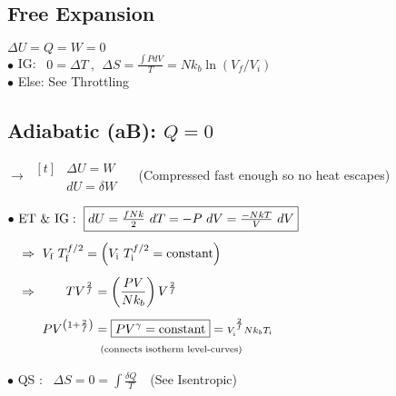 \documentclass[12pt]{article}
\begin{document}
\begin{minipage}[t]{.52\textwidth}
    \subsection{Free Expansion}
    \(\boxed{ \Delta U = Q = W = 0 }\)\\[5pt]
    \(\bullet\) IG: \ \(\boxed{ 0 = \Delta T } \ , \ \ 
        \boxed{ \Delta S = \tfrac{{\scriptstyle \int} P dV}{T} = N k_b \ln (V_f / V_i) }\)\\[5pt]
    \(\bullet\) Else: See Throttling

    \subsection{Adiabatic (aB): \(\boxed{ Q=0 }\)}
    
    \(\rightarrow\ \begin{aligned}[t]
            &\Delta U = W\\
            &\boxed{ dU = \delta W }
        \end{aligned}\) \ \ {\scriptsize(Compressed fast enough so no heat escapes)}

    \vspace{10pt}
    \(\bullet\ \begin{aligned}[t]
            &\text{ET \& IG}: \ \boxed{ dU = \tfrac{f N k}{2}\ dT = - P\ dV = \tfrac{- N k T}{V}\ dV }
                \\[5pt]
            &\Rightarrow\ V_\text{f}\ T_\text{f}^{f/2} 
                = \left( V_\text{i}\ T_\text{i}^{f/2} = \text{constant} \right)\\[5pt]
            &\Rightarrow\ \begin{aligned}[t]
                    T V^{\frac{2}{f}} &= \left( \frac{PV}{Nk_b} \right) V^{\frac{2}{f}}\\[5pt]
                    PV^{\left( 1+\frac{2}{f} \right)} &= \boxed{ PV^{\gamma} = \text{constant} }
                        = {\scriptstyle V_\text{i}^{\frac{2}{f}} N k_b T_\text{i}}\\
                    &\hspace{5pt} \text{\scriptsize(connects isotherm level-curves)}
                \end{aligned}
        \end{aligned}\)    

    \vspace{5pt}
    \(\bullet\) QS : \ \(\boxed{ \Delta S = 0  = \int \frac{\delta Q}{T} }\)\ \ {\scriptsize(See Isentropic)}
\end{minipage}
\end{document}
